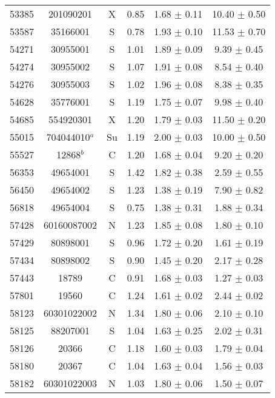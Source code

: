 \begin{longtable*}[c]{cccccc}
    53385 & 201090201 & X     & 0.85  & 1.68  $\pm$ 0.11  & 10.40 $\pm$ 0.50 \\
    53587 & 35166001 & S     & 0.78  & 1.93  $\pm$ 0.10  & 11.53 $\pm$ 0.70 \\
    54271 & 30955001 & S     & 1.01  & 1.89  $\pm$ 0.09  & 9.39  $\pm$ 0.45 \\
    54274 & 30955002 & S     & 1.07  & 1.91  $\pm$ 0.08  & 8.54  $\pm$ 0.40 \\
    54276 & 30955003 & S     & 1.02  & 1.96  $\pm$ 0.08  & 8.38  $\pm$ 0.35 \\
    54628 & 35776001 & S     & 1.19  & 1.75  $\pm$ 0.07  & 9.98  $\pm$ 0.40 \\
    54685 & 554920301 & X     & 1.20  & 1.79  $\pm$ 0.03  & 11.50 $\pm$ 0.20 \\
    55015 & 704044010$^{a}$ & Su    & 1.19  & 2.00  $\pm$ 0.03  & 10.00 $\pm$ 0.50 \\
    55527 & 12868$^{b}$ & C     & 1.20  & 1.68  $\pm$ 0.04  & 9.20  $\pm$ 0.20 \\
    56353 & 49654001 & S     & 1.42  & 1.82  $\pm$ 0.38  & 2.59  $\pm$ 0.55 \\
    56450 & 49654002 & S     & 1.23  & 1.38  $\pm$ 0.19  & 7.90  $\pm$ 0.82 \\
    56818 & 49654004 & S     & 0.75  & 1.38  $\pm$ 0.31  & 1.88  $\pm$ 0.34 \\
    57428 & 60160087002 & N     & 1.23  & 1.85  $\pm$ 0.08  & 1.80  $\pm$ 0.10 \\
    57429 & 80898001 & S     & 0.96  & 1.72  $\pm$ 0.20  & 1.61  $\pm$ 0.19 \\
    57434 & 80898002 & S     & 0.90  & 1.45  $\pm$ 0.20  & 2.17  $\pm$ 0.28 \\
    57443 & 18789 & C     & 0.91  & 1.68  $\pm$ 0.03  & 1.27  $\pm$ 0.03 \\
    57801 & 19560 & C     & 1.24  & 1.61  $\pm$ 0.02  & 2.44  $\pm$ 0.02 \\
    58123 & 60301022002 & N     & 1.34  & 1.80  $\pm$ 0.06  & 2.10  $\pm$ 0.10 \\
    58125 & 88207001 & S     & 1.04  & 1.63  $\pm$ 0.25  & 2.02  $\pm$ 0.31 \\
    58126 & 20366 & C     & 1.18  & 1.60  $\pm$ 0.03  & 1.79  $\pm$ 0.04 \\
    58180 & 20367 & C     & 1.04  & 1.63  $\pm$ 0.04  & 1.56  $\pm$ 0.03 \\
    58182 & 60301022003 & N     & 1.03  & 1.80  $\pm$ 0.06  & 1.50  $\pm$ 0.07 \\

\end{longtable*}
